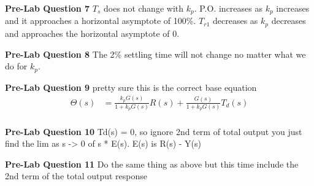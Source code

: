 \documentclass[12pt]{article}
\begin{document}
\textbf{Pre-Lab Question 7}
$T_s$ does not change with $k_p$. P.O. increases as $k_p$ increases and it approaches a horizontal asymptote of 100\%. $T_{r1}$ decreases as $k_p$ decreases and approaches the horizontal asymptote of 0.

\textbf{Pre-Lab Question 8}
The 2\% settling time will not change no matter what we do for $k_p$.

\textbf{Pre-Lab Question 9}
pretty sure this is the correct base equation
\begin{align*}
    \Theta(s) &= \frac{k_pG(s)}{1 + k_pG(s)}R(s) + \frac{G(s)}{1 + k_pG(s)}T_d(s) \\
\end{align*}

\textbf{Pre-Lab Question 10}
Td(s) = 0, so ignore 2nd term of total output
you just find the lim as s -> 0 of s * E(s). E(s) is R(s) - Y(s)
    
\textbf{Pre-Lab Question 11}
Do the same thing as above but this time include the 2nd term of the total output response

\setcounter{section}{5}
\end{document}
